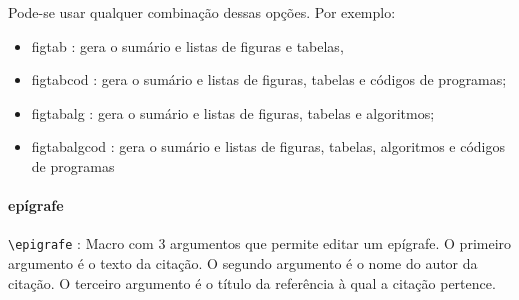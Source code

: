 Pode-se usar qualquer combinação dessas opções. Por exemplo:
\begin{itemize}
 \item \textsf{figtab} : gera o sumário e listas de figuras e tabelas,
 \item \textsf{figtabcod} : gera o sumário e listas de figuras, tabelas e códigos de programas;
 \item \textsf{figtabalg} : gera o sumário e listas de figuras, tabelas e algoritmos;
 \item \textsf{figtabalgcod} : gera o sumário e listas de figuras, tabelas, algoritmos e códigos de programas
\end{itemize}

\paragraph{epígrafe\\}
\verb|\epigrafe| : Macro com 3 argumentos que permite editar um epígrafe. O primeiro argumento é o texto da citação. O segundo argumento é o nome do autor da citação. O terceiro argumento é o título da referência à qual a citação pertence.
